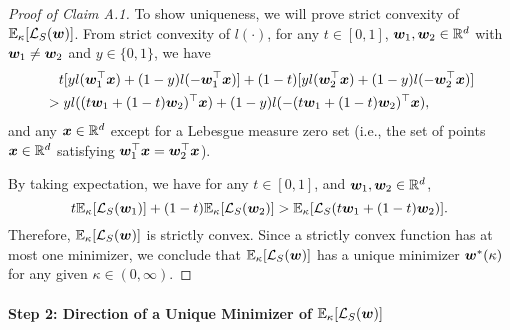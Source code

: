 \begin{proof}[Proof of Claim A.1]
To show uniqueness, we will prove strict convexity of $\mathbb{E}_\kappa[\mathcal{L}_S ({\bm{w}})]$. From strict convexity of $l(\cdot)$, for any $t \in [0,1]$, ${\bm{w}}_1, {\bm{w}}_2 \in \mathbb{R}^d$ with ${\bm{w}}_1 \neq {\bm{w}}_2$ and $y \in \{0,1\}$, we have
\begin{align*}
    &\quad t[yl({\bm{w}}_1^\top {\bm{x}}) + (1-y) l(-{\bm{w}}_1^\top {\bm{x}})] + (1-t) [yl({\bm{w}}_2^\top {\bm{x}}) + (1-y) l(-{\bm{w}}_2^\top {\bm{x}})]\\
    &> y l((t{\bm{w}}_1+(1-t){\bm{w}}_2)^\top {\bm{x}}) + (1-y) l(-(t{\bm{w}}_1+(1-t){\bm{w}}_2)^\top {\bm{x}}),
\end{align*}
and any ${\bm{x}} \in \mathbb{R}^d$ except for a Lebesgue measure zero set (i.e., the set of points ${\bm{x}} \in \mathbb{R}^d$ satisfying  ${\bm{w}}_1^\top {\bm{x}} = {\bm{w}}_2^\top {\bm{x}}$).

By taking expectation, we have for any $t \in [0,1]$, and ${\bm{w}}_1, {\bm{w}}_2 \in \mathbb{R}^d$,
\begin{equation*}
    t \mathbb{E}_\kappa[\mathcal{L}_S({\bm{w}}_1)] + (1-t) \mathbb{E}_\kappa[\mathcal{L}_S({\bm{w}}_2)] >  \mathbb{E}_\kappa[\mathcal{L}_S(t{\bm{w}}_1+(1-t){\bm{w}}_2)].
\end{equation*}
Therefore, $\mathbb{E}_\kappa[\mathcal{L}_S({\bm{w}})]$ is strictly convex.
Since a strictly convex function has at most one minimizer, we conclude that $\mathbb{E}_\kappa[\mathcal{L}_S({\bm{w}})]$ has a unique minimizer ${\bm{w}}^*(\kappa)$ for any given $\kappa \in (0,\infty)$. 
\end{proof}

\paragraph{Step 2: Direction of a Unique Minimizer of $\mathbb{E}_\kappa[\mathcal{L}_S({\bm{w}})]$} \quad

